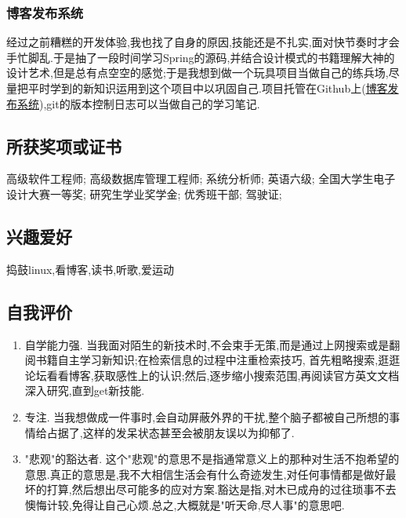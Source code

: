 \documentclass[11pt]{ctexart}
\begin{document}
\subsubsection{博客发布系统}
\label{sec-1-4-4}
经过之前糟糕的开发体验,我也找了自身的原因,技能还是不扎实,面对快节奏时才会手忙脚乱.于是抽了一段时间学习Spring的源码,并结合设计模式的书籍理解大神的设计艺术,但是总有点空空的感觉;于是我想到做一个玩具项目当做自己的练兵场,尽量把平时学到的新知识运用到这个项目中以巩固自己.项目托管在Github上(\href{http://github.com/palagend/luna}{博客发布系统}),git的版本控制日志可以当做自己的学习笔记.
\subsection{所获奖项或证书}
\label{sec-1-5}
高级软件工程师;
高级数据库管理工程师;
系统分析师;
英语六级;
全国大学生电子设计大赛一等奖;
研究生学业奖学金;
优秀班干部;
驾驶证;
\subsection{兴趣爱好}
\label{sec-1-6}
捣鼓linux,看博客,读书,听歌,爱运动
\subsection{自我评价}
\label{sec-1-7}
\begin{enumerate}
\item 自学能力强. 当我面对陌生的新技术时,不会束手无策,而是通过上网搜索或是翻阅书籍自主学习新知识;在检索信息的过程中注重检索技巧, 首先粗略搜索,逛逛论坛看看博客,获取感性上的认识;然后,逐步缩小搜索范围,再阅读官方英文文档深入研究,直到get新技能.\\
\item 专注. 当我想做成一件事时,会自动屏蔽外界的干扰,整个脑子都被自己所想的事情给占据了,这样的发呆状态甚至会被朋友误以为抑郁了.\\
\item "悲观"的豁达者. 这个"悲观"的意思不是指通常意义上的那种对生活不抱希望的意思.真正的意思是,我不大相信生活会有什么奇迹发生,对任何事情都是做好最坏的打算,然后想出尽可能多的应对方案.豁达是指,对木已成舟的过往琐事不去懊悔计较,免得让自己心烦.总之,大概就是"听天命,尽人事"的意思吧.
\end{enumerate}
\end{document}
